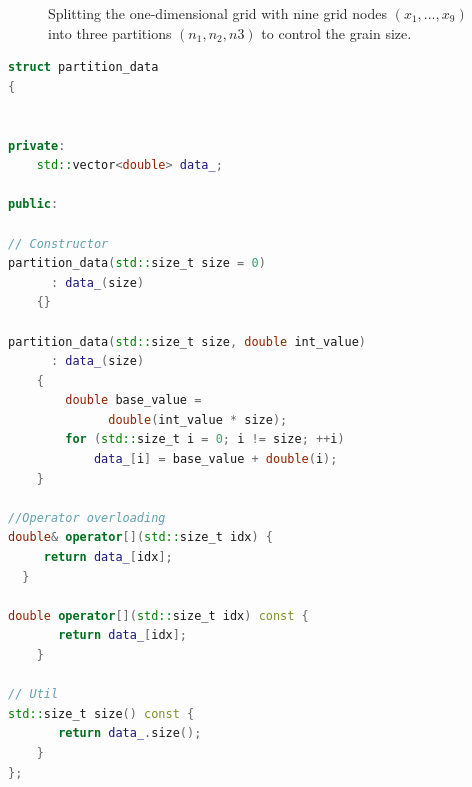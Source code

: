 \begin{figure}[tp]
\centering
{}
\caption{Splitting the one-dimensional grid with nine grid nodes $(x_1,\ldots,x_9)$ into three partitions $(n_1,n_2,n3)$ to control the grain size.}
\end{figure}



\begin{lstlisting}[language=c++,caption={Serial implementation of the one-dimensional heat equation with grain size control. \label{code:heat:garain:size}},float,floatplacement=tbp]
struct partition_data
{


private:
    std::vector<double> data_;

public:

// Constructor
partition_data(std::size_t size = 0)
      : data_(size)
    {}

partition_data(std::size_t size, double int_value)
      : data_(size)
    {
        double base_value = 
              double(int_value * size);
        for (std::size_t i = 0; i != size; ++i)
            data_[i] = base_value + double(i);
    }

//Operator overloading 
double& operator[](std::size_t idx) { 
     return data_[idx]; 
  }
    
double operator[](std::size_t idx) const { 
       return data_[idx]; 
    }

// Util
std::size_t size() const { 
       return data_.size(); 
    }
};
\end{lstlisting}

